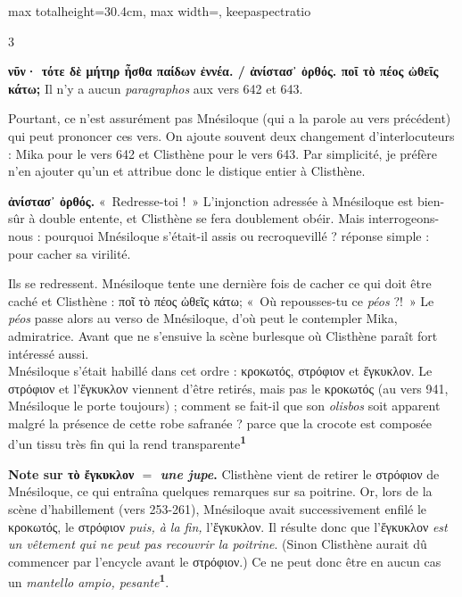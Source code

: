 \documentclass[11pt,twoside]{book}
\newcommand{\italique}[1]{\textit{#1}}
\newcommand{\italien}[1]{\textit{#1}}
\newcommand{\marqueur}[1]{\textsuperscript{\color{rubricRed}\textbf{#1}}}
\begin{document}
\begin{adjustbox}{max totalheight=30.4cm, max width=\textwidth, keepaspectratio}
\begin{minipage}{\textwidth}
{\begin{multicols}{3}
\par\vspace{1.5pt}
 \textbf{νῦν· τότε δὲ μήτηρ ἦσθα παίδων ἐννέα. / ἀνίστασ᾽ ὀρθός. ποῖ τὸ πέος ὠθεῖς κάτω;} Il n'y a aucun \italique{paragraphos} aux vers 642 et 643.
\par\vspace{1.5pt}
\noindent Pourtant, ce n'est assurément pas Mnésiloque (qui a la parole au vers précédent) qui peut prononcer ces vers. On ajoute souvent deux changement d'interlocuteurs : Mika pour le vers 642 et Clisthène pour le vers 643. Par simplicité, je préfère n'en ajouter qu'un et attribue donc le distique entier à Clisthène.
\par\vspace{1.5pt}
 \textbf{ἀνίστασ᾽ ὀρθός.} «~Redresse-toi !~» L'injonction adressée à Mnésiloque est bien-sûr à double entente, et Clisthène se fera doublement obéir. Mais interrogeons-nous : pourquoi Mnésiloque s'était-il assis ou recroquevillé ? réponse simple : pour cacher sa virilité.
\par\vspace{1.5pt}
\noindent Ils se redressent. Mnésiloque tente une dernière fois de cacher ce qui doit être caché et Clisthène : ποῖ τὸ πέος ὠθεῖς κάτω; «~Où repousses-tu ce \italique{péos} ?!~» Le \italique{péos} passe alors au verso de Mnésiloque, d'où peut le contempler Mika, admiratrice. Avant que ne s'ensuive la scène burlesque où Clisthène paraît fort intéressé aussi.\\ Mnésiloque s'était habillé dans cet ordre : κροκωτός, στρόφιον et ἔγκυκλον. Le στρόφιον et l'ἔγκυκλον viennent d'être retirés, mais pas le κροκωτός (au vers 941, Mnésiloque le porte toujours) ; comment se fait-il que son \italique{olisbos} soit apparent malgré la présence de cette robe safranée ? parce que la crocote est composée d'un tissu très fin qui la rend transparente\marqueur{1}
\par\vspace{1.5pt}
 \textbf{Note sur τὸ ἔγκυκλον $=$ \italique{une jupe}.} Clisthène vient de retirer le στρόφιον de Mnésiloque, ce qui entraîna quelques remarques sur sa poitrine. Or, lors de la scène d'habillement (vers 253-261), Mnésiloque avait successivement enfilé le κροκωτός, le στρόφιον \italique{puis, à la fin,} l'ἔγκυκλον. Il résulte donc que l'ἔγκυκλον \italique{est un vêtement qui ne peut pas recouvrir la poitrine}. (Sinon Clisthène aurait dû commencer par l'encycle avant le στρόφιον.)  Ce ne peut donc être en aucun cas un \italien{mantello ampio, pesante}\marqueur{1}.

\end{multicols}}
\end{minipage}
\end{adjustbox}
\end{document}

